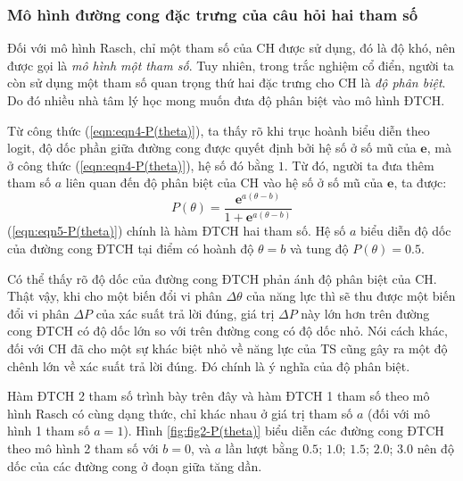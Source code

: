 \subsubsection{Mô hình đường cong đặc trưng của câu hỏi hai tham số}
Đối với mô hình Rasch, chỉ một tham số của CH được sử dụng, đó là độ khó, nên được gọi là \textit{mô hình một tham số}. Tuy nhiên, trong trắc nghiệm cổ điển, người ta còn sử dụng một tham số quan trọng thứ hai đặc trưng cho CH là \textit{độ phân biệt}. Do đó nhiều nhà tâm lý học mong muốn đưa độ phân biệt vào mô hình ĐTCH.\par
Từ công thức (\ref{eqn:eqn4-P(theta)}), ta thấy rõ khi trục hoành biểu diễn theo logit, độ dốc phần giữa đường cong được quyết định bởi hệ số ở số mũ của $\mathbf{e}$, mà ở công thức (\ref{eqn:eqn4-P(theta)}), hệ số đó bằng $1$. Từ đó, người ta đưa thêm tham số $a$ liên quan đến độ phân biệt của CH vào hệ số ở số mũ của $\mathbf{e}$, ta được:
\begin{equation}\label{eqn:eqn5-P(theta)}
	P(\theta)=\frac{\mathbf{e}^{a(\theta-b)}}{1+\mathbf{e}^{a(\theta-b)}}
\end{equation}
(\ref{eqn:eqn5-P(theta)}) chính là hàm ĐTCH hai tham số. Hệ số $a$ biểu diễn độ dốc của đường cong ĐTCH tại điểm có hoành độ $\theta=b$ và tung độ $P(\theta)=0.5$.\par
Có thể thấy rõ độ dốc của đường cong ĐTCH phản ánh độ phân biệt của CH. Thật vậy, khi cho một biến đổi vi phân $\Delta\theta$ của năng lực thì sẽ thu được một biến đổi vi phân $\Delta P$ của xác suất trả lời đúng, giá trị $\Delta P$ này lớn hơn trên đường cong ĐTCH có độ dốc lớn so với trên đường cong có độ dốc nhỏ. Nói cách khác, đối với CH đã cho một sự khác biệt nhỏ về năng lực của TS cũng gây ra một độ chênh lớn về xác suất trả lời đúng. Đó chính là ý nghĩa của độ phân biệt.\par
Hàm ĐTCH 2 tham số trình bày trên đây và hàm ĐTCH 1 tham số theo mô hình Rasch có cùng dạng thức, chỉ khác nhau ở giá trị tham số $a$ (đối với mô hình 1 tham số $a=1$). Hình \ref{fig:fig2-P(theta)} biểu diễn các đường cong ĐTCH theo mô hình 2 tham số với $b=0$, và $a$ lần lượt bằng {\color{mGreen}$0.5$}; {\color{mTeal}$1.0$}; {\color{mBlue}$1.5$}; {\color{mIndigo}$2.0$}; {\color{mPurple}$3.0$} nên độ dốc của các đường cong ở đoạn giữa tăng dần.\par
